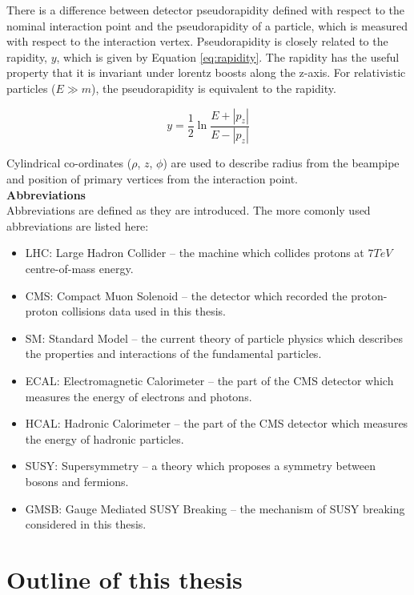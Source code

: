 There is a difference between detector pseudorapidity defined with respect to
the nominal interaction point and the pseudorapidity of a particle, which is
measured with respect to the interaction vertex. Pseudorapidity is closely 
related to the rapidity, $y$, which is given by Equation \ref{eq:rapidity}. The 
rapidity has the useful property that it is invariant under lorentz boosts along 
the z-axis. For relativistic particles ($E \gg m$), the pseudorapidity is 
equivalent to the rapidity.

\begin{equation}
y = \frac{1}{2}\ln\frac{E + |p_{z}|}{E - |p_{z}|}
\label{eq:rapidity}
\end{equation}

Cylindrical co-ordinates ($\rho$, $z$, $\phi$) are used to describe radius from 
the beampipe and position of primary vertices from the interaction point. \\

{\bf Abbreviations} \\

Abbreviations are defined as they are introduced. The more comonly used
abbreviations are listed here:

\begin{itemize}
\item LHC: Large Hadron Collider -- the machine which collides protons at
$7\unit{TeV}$ centre-of-mass energy.
\item CMS: Compact Muon Solenoid -- the detector which recorded the 
proton-proton collisions data used in this thesis.
\item SM: Standard Model -- the current theory of particle physics which
describes the properties and interactions of the fundamental particles.
\item ECAL: Electromagnetic Calorimeter -- the part of the CMS detector which 
measures the energy of electrons and photons.
\item HCAL: Hadronic Calorimeter -- the part of the CMS detector which measures
the energy of hadronic particles.
\item SUSY: Supersymmetry -- a theory which proposes a symmetry between bosons
and fermions. 
\item GMSB: Gauge Mediated SUSY Breaking -- the mechanism of SUSY breaking
considered in this thesis.
\end{itemize}

\section{Outline of this thesis}

